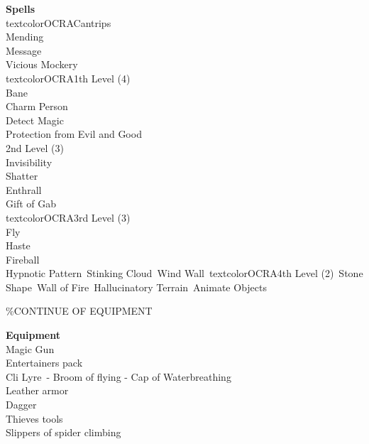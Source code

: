 \documentclass[11pt]{article}
\begin{document}
\begin{minipage}[t]{.5\textwidth}
{\huge \textbf{\Fontauri Spells}}\\
textcolor{OCRA}{Cantrips}\\
Mending\\
Message\\
Vicious Mockery\\
textcolor{OCRA}{1th Level (4)}\\
Bane \\
Charm Person\\
Detect Magic\\
Protection from Evil and Good\\
\textcolor{OCRA}{2nd Level (3)}\\
Invisibility\\
Shatter\\
Enthrall\\
Gift of Gab\\
textcolor{OCRA}{3rd Level (3)}\\
Fly\\
Haste\\
Fireball\\
Hypnotic Pattern\
Stinking Cloud\
Wind Wall\
textcolor{OCRA}{4th Level (2)}\
Stone Shape\
Wall of Fire\
Hallucinatory Terrain\
Animate Objects
\end{minipage}
\%CONTINUE OF EQUIPMENT
\begin{minipage}[t]{.4\textwidth}\raggedleft
{\Large \textbf{ \Fontauri Equipment}}\\
Magic Gun \\
Entertainers pack\\
Cli Lyre\ - Broom of flying - Cap of Waterbreathing\\
Leather armor \\
Dagger\\
Thieves tools\\
Slippers of spider climbing\\
\end{minipage}
\end{document}
